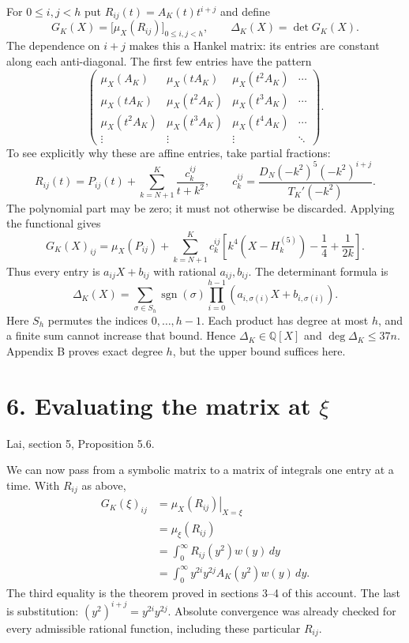 \documentclass[11pt]{article}
\newcommand{\Q}{\mathbb Q}
\newcommand{\dd}{\,d}
\newcommand{\Hfive}[1]{H_{#1}^{(5)}}
\newcommand{\source}[1]{{\small\color{blue!45!black}#1}\par}
\newcommand{\heading}[2]{\section*{#1}\source{#2}}
\begin{document}
For $0\leq i,j<h$ put $R_{ij}(t)=A_K(t)t^{i+j}$ and define
\begin{equation}\label{eq:G}
 G_K(X)=\bigl[\mu_X(R_{ij})\bigr]_{0\leq i,j<h},
 \qquad \Delta_K(X)=\det G_K(X).
\end{equation}
The dependence on $i+j$ makes this a Hankel matrix: its entries are constant
along each anti-diagonal. The first few entries have the pattern
\[
 \begin{pmatrix}
 \mu_X(A_K)&\mu_X(tA_K)&\mu_X(t^2A_K)&\cdots\\
 \mu_X(tA_K)&\mu_X(t^2A_K)&\mu_X(t^3A_K)&\cdots\\
 \mu_X(t^2A_K)&\mu_X(t^3A_K)&\mu_X(t^4A_K)&\cdots\\
 \vdots&\vdots&\vdots&\ddots
 \end{pmatrix}.
\]
To see explicitly why these are affine entries, take partial fractions:
\[
 R_{ij}(t)=P_{ij}(t)+\sum_{k=N+1}^K\frac{c_k^{ij}}{t+k^2},
 \qquad
 c_k^{ij}=\frac{D_N(-k^2)^5(-k^2)^{i+j}}{T_K'(-k^2)}.
\]
The polynomial part may be zero; it must not otherwise be discarded.
Applying the functional gives
\[
 G_K(X)_{ij}=\mu_X(P_{ij})+
 \sum_{k=N+1}^K c_k^{ij}
 \left[k^4(X-\Hfive{k})-\frac14+\frac1{2k}\right].
\]
Thus every entry is $a_{ij}X+b_{ij}$ with rational $a_{ij},b_{ij}$.
The determinant formula is
\[
 \Delta_K(X)=\sum_{\sigma\in S_h}\operatorname{sgn}(\sigma)
       \prod_{i=0}^{h-1}(a_{i,\sigma(i)}X+b_{i,\sigma(i)}).
\]
Here $S_h$ permutes the indices $0,\ldots,h-1$.
Each product has degree at most $h$, and a finite sum cannot increase that
bound. Hence $\Delta_K\in\Q[X]$ and $\deg\Delta_K\leq37n$.
Appendix B proves exact degree $h$, but the upper bound suffices here.

\newpage
\heading{6. Evaluating the matrix at $\xi$}{Lai, section 5, Proposition 5.6.}
We can now pass from a symbolic matrix to a matrix of integrals one entry
at a time. With $R_{ij}$ as above,
\begin{align*}
 G_K(\xi)_{ij}
 &=\left.\mu_X(R_{ij})\right|_{X=\xi}\\
 &=\mu_\xi(R_{ij})\\
 &=\int_0^\infty R_{ij}(y^2)w(y)\dd y\\
 &=\int_0^\infty y^{2i}y^{2j}A_K(y^2)w(y)\dd y.
\end{align*}
The third equality is the theorem proved in sections 3--4 of this account.
The last is substitution: $(y^2)^{i+j}=y^{2i}y^{2j}$.
Absolute convergence was already checked for every admissible rational
function, including these particular $R_{ij}$.
\end{document}
